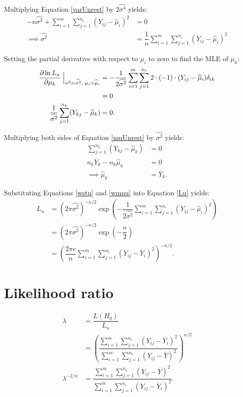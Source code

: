 \documentclass[12pt,a4paper,openright]{article}
\newcommand{\eqn}[1]{Equation \ref{#1}}
\newcommand{\ovY}{\overline{Y}}
\newcommand{\wmu}{\widehat{\mu}}
\newcommand{\wst}{\widehat{\sigma^2}}
\begin{document}
	Multiplying \eqn{varUnrest} by $2\widehat{\sigma^4}$ yields:
	\begin{align}
		-n\wst + \sum_{i=1}^m \sum_{j=1}^{n_i} (Y_{ij}-\wmu_i)^2 &= 0 \nonumber \\
		\implies \wst &= \dfrac{1}{n}\sum_{i=1}^m \sum_{j=1}^{n_i} (Y_{ij}-\wmu_i)^2 \label{wstu}
	\end{align}
	
	Setting the partial derivative with respect to $\mu_i$ to zero to find the MLE of $\mu_k$:
	\begin{align}
		\dfrac{\partial \ln{L_u}}{\partial \mu_k} \Bigm\lvert_{\sigma^2=\wst,\hspace{0.1cm}\mu_i=\wmu_i} &= -\dfrac{1}{2\wst} \sum_{i=1}^m \sum_{j=1}^{n_i} 2\cdot (-1)\cdot (Y_{ij}-\wmu_i)\delta_{ik} \nonumber \\
		&= 0 \nonumber\\
		\dfrac{1}{\wst}\sum_{j=1}^{n_k} (Y_{kj}-\wmu_k) &= 0. \label{muUnrest}
	\end{align}

	Multiplying both sides of \eqn{muUnrest} by $\wst$ yields:
	\begin{align}
		\sum_{j=1}^{n_k} (Y_{kj}-\wmu_k) &= 0 \nonumber \\
		n_k\ovY_k - n_k\wmu_k &= 0 \nonumber \\ 
		\implies \wmu_k &= \ovY_k. \label{wmuu}
	\end{align}

	Substituting Equations \ref{wstu} and \ref{wmuu} into \eqn{Lu} yields:
	\begin{align}
		L_u &= (2\pi \wst)^{-n/2} \exp{\left(-\dfrac{1}{2\wst}\sum_{i=1}^m \sum_{j=1}^{n_i} (Y_{ij}-\wmu_i)^2\right)} \nonumber \\
		&= (2\pi \wst)^{-n/2} \exp{\left(-\dfrac{n}{2}\right)} \nonumber \\
		&= \left(\dfrac{2\pi e}{n} \sum_{i=1}^m \sum_{j=1}^{n_i} (Y_{ij}-\ovY_i)^2\right)^{-n/2}. \label{MLEu}
	\end{align}

	\section{Likelihood ratio}
	\begin{align}
		\lambda &= \dfrac{L(H_0)}{L_u} \nonumber\\
		&= \left(\dfrac{\sum_{i=1}^m \sum_{j=1}^{n_i} (Y_{ij}-\ovY_i)^2}{\sum_{i=1}^m \sum_{j=1}^{n_i} (Y_{ij}-\ovY)^2}\right)^{n/2} \nonumber \\
		\lambda^{-2/n} &= \dfrac{\sum_{i=1}^m \sum_{j=1}^{n_i} (Y_{ij}-\ovY)^2}{\sum_{i=1}^m \sum_{j=1}^{n_i} (Y_{ij}-\ovY_i)^2}.\label{ratio}
	\end{align}
\end{document}
